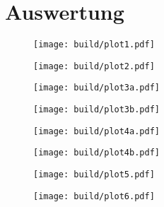 \section{Auswertung}
\label{sec:auswertung}

\begin{figure}[H]
	\texttt{[image: build/plot1.pdf]}
\end{figure}

\begin{figure}[H]
	\texttt{[image: build/plot2.pdf]}
\end{figure}

\begin{figure}[H]
	\texttt{[image: build/plot3a.pdf]}
\end{figure}

\begin{figure}[H]
	\texttt{[image: build/plot3b.pdf]}
\end{figure}

\begin{figure}[H]
	\texttt{[image: build/plot4a.pdf]}
\end{figure}

\begin{figure}[H]
	\texttt{[image: build/plot4b.pdf]}
\end{figure}

\begin{figure}[H]
	\texttt{[image: build/plot5.pdf]}
\end{figure}

\begin{figure}[H]
	\texttt{[image: build/plot6.pdf]}
\end{figure}

